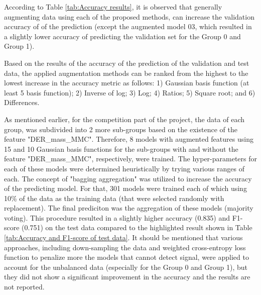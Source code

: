 \documentclass[10pt,conference,compsocconf]{IEEEtran}
\begin{document}
According to Table \ref{tab:Accuracy results}, it is observed that generally augmenting data using each of the proposed methods, can increase the validation accuracy of of the prediction (except the augmented model 03, which resulted in a slightly lower accuracy of predicting the validation set for the Group 0 and Group 1). 

Based on the results of the accuracy of the prediction of the validation and test data, the applied augmentation methods can be ranked from the highest to the lowest increase in the accuracy metric as follows: 1) Gaussian basis function (at least 5 basis function); 2) Inverse of log; 3) Log; 4) Ratios; 5) Square root; and 6) Differences.



As mentioned earlier, for the competition part of the project, the data of each group, was subdivided into 2 more sub-groups based on the existence of the feature "DER\_mass\_MMC". Therefore, 8  models with augmented features using 15 and 10 Gaussian basis functions for the sub-groups with and without the feature "DER\_mass\_MMC", respectively,  were trained. The hyper-parameters for each of these models were determined heuristically by trying various ranges of each. The concept of "bagging aggregation" was utilized to increase the  accuracy of the predicting model. For that, 301 models were trained each of which using 10\% of the data as the training data (that were selected randomly with replacement). The final prediciton was the aggregation of these models (majority voting). This procedure resulted in a slightly higher accuracy (0.835) and F1-score (0.751) on the test data compared to the highlighted result shown in Table \ref{tab:Accuracy and F1-score of test data}. It should be mentioned that various approaches, including down-sampling the data and weighted cross-entropy loss function to penalize more the models that cannot detect signal, were applied to account for the unbalanced data (especially for the Group 0 and Group 1), but they did not show a significant improvement in the accuracy and the results are not reported. 
\end{document}
